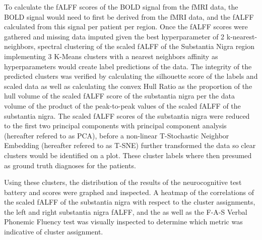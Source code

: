 \documentclass[12pt]{article}
\begin{document}
To calculate the fALFF scores of the BOLD signal from the fMRI data, the BOLD signal would need to first be derived from the fMRI data, and the fALFF calculated from this signal per patient per region. Once the fALFF scores were gathered and missing data imputed given the best hyperparameter of 2 k-nearest-neighbors, spectral clustering of the scaled fALFF of the Substantia Nigra region implementing 3 K-Means clusters with a nearest neighbors affinity as hyperparameters would create label predictions of the data. The integrity of the predicted clusters was verified by calculating the silhouette score of the labels and scaled data as well as calculating the convex Hull Ratio as the proportion of the hull volume of the scaled fALFF score of the substantia nigra per the data volume of the product of the peak-to-peak values of the scaled fALFF of the substantia nigra. The scaled fALFF scores of the substantia nigra were reduced to the first two principal components with principal component analysis (hereafter refered to as PCA), before a non-linear T-Stochastic Neighbor Embedding (hereafter refered to as T-SNE) further transformed the data so clear clusters would be identified on a plot. These cluster labels where then presumed as ground truth diagnoses for the patients. 

Using these clusters, the distribution of the results of the neurocognitive test battery and scores were graphed and inspected. A heatmap of the correlations of the scaled fALFF of the substantia nigra with respect to the cluster assignments, the left and right substantia nigra fALFF, and the as well as the F-A-S Verbal Phonemic Fluency test was visually inspected to determine which metric was indicative of cluster assignment. 
\end{document}
